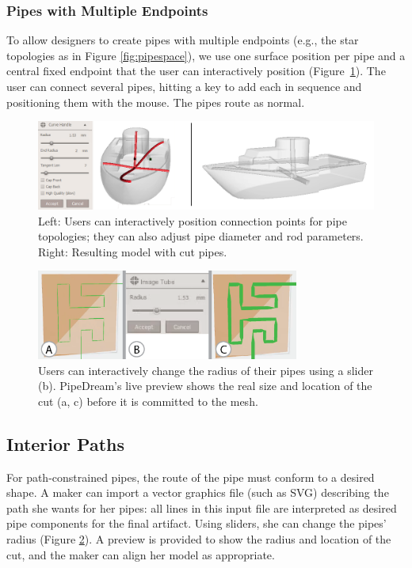 \subsubsection{Pipes with Multiple Endpoints}
To allow designers to create pipes with multiple endpoints (e.g., the star topologies as in Figure \ref{fig:pipespace}), we use one surface position per pipe and a central fixed endpoint that the user can interactively position (Figure~\ref{fig:boat-star}).  The user can connect several pipes, hitting a key to add each in sequence and positioning them with the mouse.  The pipes route as normal.

\begin{figure}[b]
\centering
    \includegraphics[width=1.0\columnwidth]{figures/boat-star.png}
\caption{Left: Users can interactively position connection points for pipe topologies; they can also adjust pipe diameter and rod parameters. Right: Resulting model with cut pipes.}
\label{fig:boat-star}
\end{figure}

\begin{figure}
\centering
    \includegraphics[width=3.4in]{figures/radius.png}
\caption{Users can interactively change the radius of their pipes using a slider (b).  PipeDream's live preview shows the real size and location of the cut (a, c) before it is committed to the mesh.}
\label{fig:radius}
\end{figure}

\subsection{Interior Paths}

For path-constrained pipes, the route of the pipe must conform to a desired shape. A maker can import a vector graphics file (such as SVG) describing the path she wants for her pipes: all lines in this input file are interpreted as desired pipe components for the final artifact.  Using sliders, she can change the pipes' radius (Figure \ref{fig:radius}).  A preview is provided to show the radius and location of the cut, and the maker can align her model as appropriate.

